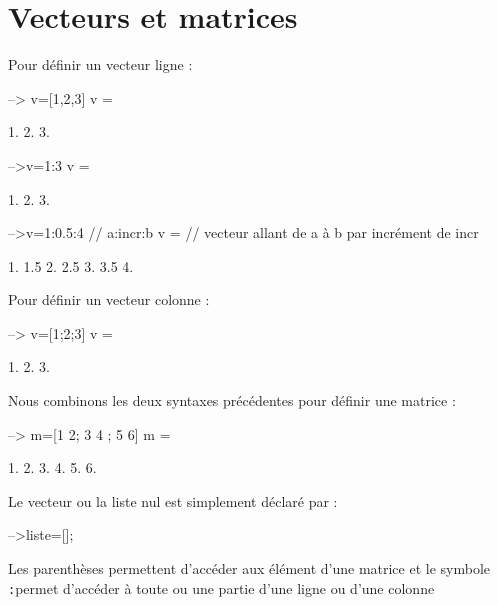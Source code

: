 \section{Vecteurs et matrices}
Pour définir un vecteur ligne :
\begin{Scilabcode}
--> v=[1,2,3]
 v  =
 
    1.    2.    3. 

-->v=1:3
 v  =
 
    1.    2.    3.

-->v=1:0.5:4           // a:incr:b
 v  =                  // vecteur allant de a à b par incrément de incr
 
    1.    1.5    2.    2.5    3.    3.5    4.
\end{Scilabcode}
Pour définir un vecteur colonne :
\begin{Scilabcode}
--> v=[1;2;3]
 v  =
 
    1.    
    2.
    3. 
\end{Scilabcode}
Nous combinons les deux syntaxes précédentes pour définir une matrice : 
\begin{Scilabcode}
--> m=[1 2; 3 4 ; 5 6]
 m  =
 
    1.    2.  
    3.    4.  
    5.    6.  
\end{Scilabcode}
Le vecteur ou la liste nul est simplement déclaré par :
\begin{Scilabcode}
-->liste=[];
\end{Scilabcode}
Les parenthèses permettent d'accéder aux élément d'une matrice et le 
symbole \og\verb?:?\fg permet d'accéder à toute ou une partie d'une 
ligne ou d'une colonne

